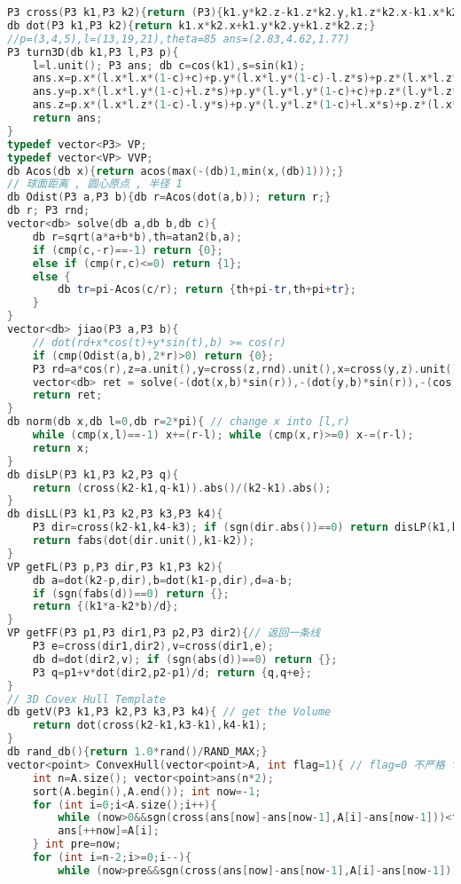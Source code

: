 \begin{lstlisting}[language=C++]
P3 cross(P3 k1,P3 k2){return (P3){k1.y*k2.z-k1.z*k2.y,k1.z*k2.x-k1.x*k2.z,k1.x*k2.y-k1.y*k2.x};}
db dot(P3 k1,P3 k2){return k1.x*k2.x+k1.y*k2.y+k1.z*k2.z;}
//p=(3,4,5),l=(13,19,21),theta=85 ans=(2.83,4.62,1.77)
P3 turn3D(db k1,P3 l,P3 p){
    l=l.unit(); P3 ans; db c=cos(k1),s=sin(k1);
    ans.x=p.x*(l.x*l.x*(1-c)+c)+p.y*(l.x*l.y*(1-c)-l.z*s)+p.z*(l.x*l.z*(1-c)+l.y*s);
    ans.y=p.x*(l.x*l.y*(1-c)+l.z*s)+p.y*(l.y*l.y*(1-c)+c)+p.z*(l.y*l.z*(1-c)-l.x*s);
    ans.z=p.x*(l.x*l.z*(1-c)-l.y*s)+p.y*(l.y*l.z*(1-c)+l.x*s)+p.z*(l.x*l.x*(1-c)+c);
    return ans;
}
typedef vector<P3> VP;
typedef vector<VP> VVP;
db Acos(db x){return acos(max(-(db)1,min(x,(db)1)));}
// 球面距离 , 圆心原点 , 半径 1
db Odist(P3 a,P3 b){db r=Acos(dot(a,b)); return r;}
db r; P3 rnd;
vector<db> solve(db a,db b,db c){
    db r=sqrt(a*a+b*b),th=atan2(b,a);
    if (cmp(c,-r)==-1) return {0};
    else if (cmp(r,c)<=0) return {1};
    else {
        db tr=pi-Acos(c/r); return {th+pi-tr,th+pi+tr};
    }
}
vector<db> jiao(P3 a,P3 b){
    // dot(rd+x*cos(t)+y*sin(t),b) >= cos(r)
    if (cmp(Odist(a,b),2*r)>0) return {0};
    P3 rd=a*cos(r),z=a.unit(),y=cross(z,rnd).unit(),x=cross(y,z).unit();
    vector<db> ret = solve(-(dot(x,b)*sin(r)),-(dot(y,b)*sin(r)),-(cos(r)-dot(rd,b))); 
    return ret;
}
db norm(db x,db l=0,db r=2*pi){ // change x into [l,r)
    while (cmp(x,l)==-1) x+=(r-l); while (cmp(x,r)>=0) x-=(r-l);
    return x;
}
db disLP(P3 k1,P3 k2,P3 q){
    return (cross(k2-k1,q-k1)).abs()/(k2-k1).abs();
}
db disLL(P3 k1,P3 k2,P3 k3,P3 k4){
    P3 dir=cross(k2-k1,k4-k3); if (sgn(dir.abs())==0) return disLP(k1,k2,k3);
    return fabs(dot(dir.unit(),k1-k2));
}
VP getFL(P3 p,P3 dir,P3 k1,P3 k2){
    db a=dot(k2-p,dir),b=dot(k1-p,dir),d=a-b;
    if (sgn(fabs(d))==0) return {};
    return {(k1*a-k2*b)/d};
}
VP getFF(P3 p1,P3 dir1,P3 p2,P3 dir2){// 返回一条线
    P3 e=cross(dir1,dir2),v=cross(dir1,e);
    db d=dot(dir2,v); if (sgn(abs(d))==0) return {};
    P3 q=p1+v*dot(dir2,p2-p1)/d; return {q,q+e};
}
// 3D Covex Hull Template
db getV(P3 k1,P3 k2,P3 k3,P3 k4){ // get the Volume
    return dot(cross(k2-k1,k3-k1),k4-k1);
}
db rand_db(){return 1.0*rand()/RAND_MAX;}
vector<point> ConvexHull(vector<point>A, int flag=1){ // flag=0 不严格 flag=1 严格 
    int n=A.size(); vector<point>ans(n*2); 
    sort(A.begin(),A.end()); int now=-1;
    for (int i=0;i<A.size();i++){
        while (now>0&&sgn(cross(ans[now]-ans[now-1],A[i]-ans[now-1]))<flag) now--;
        ans[++now]=A[i];
    } int pre=now;
    for (int i=n-2;i>=0;i--){
        while (now>pre&&sgn(cross(ans[now]-ans[now-1],A[i]-ans[now-1]))<flag) now--;

\end{lstlisting}
